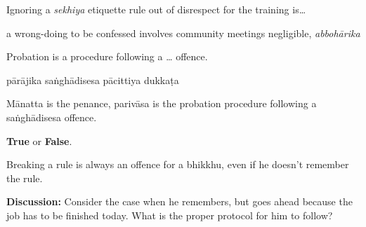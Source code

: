 \begin{exam}{\autoExamName}
\begin{problem*}
\end{problem*}

\problemDivide

\begin{problem*}

  \begin{parts}

  \item Ignoring a \emph{sekhiya} etiquette rule out of disrespect for the
    training is\ldots

    \begin{answers}{4}
      \bChoices
       a wrong-doing\eAns
       to be confessed\eAns
       involves community meetings\eAns
       negligible, \emph{abbohārika}\eAns
      \eChoices
    \end{answers}

  \item Probation is a procedure following a \ldots{} offence.

    \begin{answers}{4}
      \bChoices
       pārājika\eAns
       saṅghādisesa\eAns
       pācittiya\eAns
       dukkaṭa\eAns
      \eChoices
    \end{answers}

  \end{parts}
  
  \bigskip

  \begin{solution}
    Mānatta is the penance, parivāsa is the probation procedure following a saṅghādisesa offence.
  \end{solution}

\end{problem*}


\begin{problem*}

  \textbf{True} or \textbf{False}.

  \bigskip

  \begin{parts}

  \item {} Breaking a rule is always an offence for a bhikkhu, even if he doesn't
    remember the rule.

    \bigskip

    \textbf{Discussion:} Consider the case when he remembers, but goes ahead because the job has to be finished today.
    What is the proper protocol for him to follow?


\end{parts}
\end{problem*}
\end{exam}
